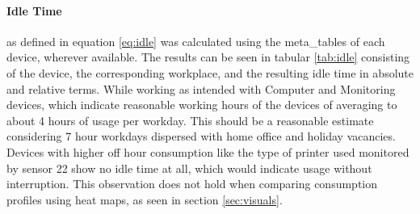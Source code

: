 \paragraph{Idle Time} as defined in equation \ref{eq:idle} was calculated using the meta\_tables of each device, wherever available. The results can be seen in tabular \ref{tab:idle} consisting of the device, the corresponding workplace, and the resulting idle time in absolute and relative terms. While working as intended with Computer and Monitoring devices, which indicate reasonable working hours of the devices of averaging to about 4 hours of usage per workday. This should be a reasonable estimate considering 7 hour workdays dispersed with home office and holiday vacancies. Devices with higher off hour consumption like the type of printer used monitored by sensor 22 show no idle time at all, which would indicate usage without interruption. This observation does not hold when comparing consumption profiles using heat maps, as seen in section \ref{sec:visuals}.
